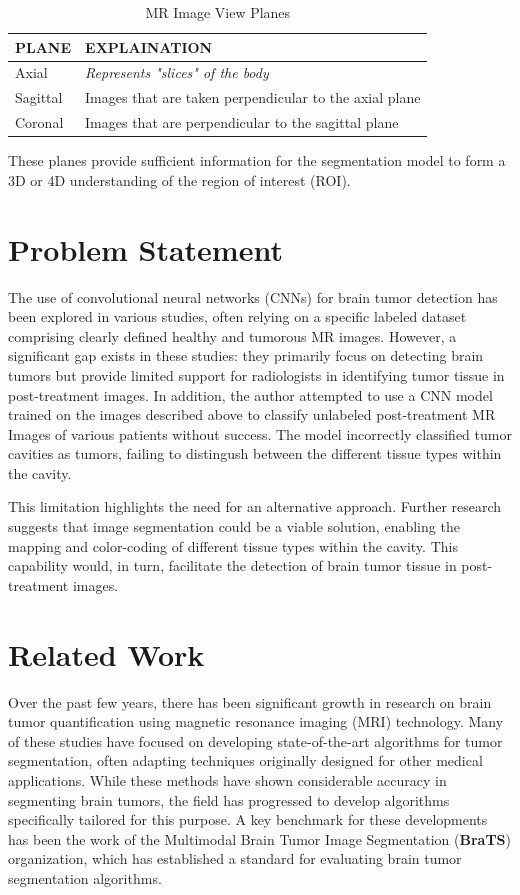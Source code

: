 \documentclass[12pt, onecolumn]{IEEEtran}
\begin{document}
\begin{table}[H]
	\centering
	\caption{MR Image View Planes}
	\begin{tabular}{|l|l|}
		\hline
		\textbf{PLANE} & \textbf{EXPLAINATION}                                  \\ \hline
		Axial          & \textit{Represents "slices" of the body}               \\ \hline
		Sagittal       & Images that are taken perpendicular to the axial plane \\ \hline
		Coronal        & Images that are perpendicular to the sagittal plane    \\ \hline
	\end{tabular}
\end{table}
These planes provide sufficient information for the segmentation model to form a 3D or 4D understanding of the region of interest (ROI).

\section{Problem Statement}
The use of convolutional neural networks (CNNs) for brain tumor detection has been explored in various studies, often relying on a specific labeled dataset comprising clearly defined healthy and tumorous MR images. However, a significant gap exists in these studies: they primarily focus on detecting brain tumors but provide limited support for radiologists in identifying tumor tissue in post-treatment images.  In addition, the author attempted to use a CNN model trained on the images described above to classify unlabeled post-treatment MR Images of various patients without success.  The model incorrectly classified tumor cavities as tumors, failing to distingush between the different tissue types within the cavity. 

This limitation highlights the need for an alternative approach. Further research suggests that image segmentation could be a viable solution, enabling the mapping and color-coding of different tissue types within the cavity. This capability would, in turn, facilitate the detection of brain tumor tissue in post-treatment images.

\section{Related Work}
Over the past few years, there has been significant growth in research on brain tumor quantification using magnetic resonance imaging (MRI) technology. Many of these studies have focused on developing state-of-the-art algorithms for tumor segmentation, often adapting techniques originally designed for other medical applications. While these methods have shown considerable accuracy in segmenting brain tumors, the field has progressed to develop algorithms specifically tailored for this purpose.  A key benchmark for these developments has been the work of the Multimodal Brain Tumor Image Segmentation (\textbf{BraTS}) organization, which has established a standard for evaluating brain tumor segmentation algorithms\cite{menze2015}.
\end{document}

